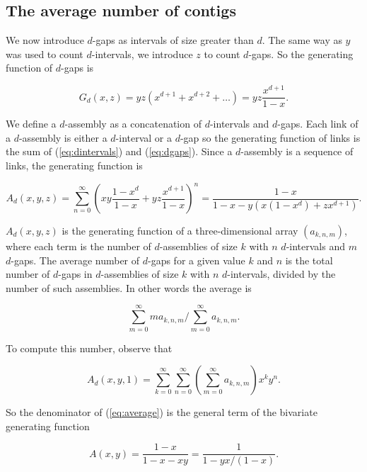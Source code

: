 \documentclass{article}
\begin{document}
\subsection{The average number of contigs}

We now introduce $d$-gaps as intervals of size greater than $d$. The same
way as $y$ was used to count $d$-intervals, we introduce $z$ to count
$d$-gaps. So the generating function of $d$-gaps is

\begin{equation}
\label{eq:dgaps}
G_d(x,z) = yz(x^{d+1}+x^{d+2}+\ldots) = yz\frac{x^{d+1}}{1-x}.
\end{equation}

We define a $d$-assembly as a concatenation of $d$-intervals and $d$-gaps.
Each link of a $d$-assembly is either a $d$-interval or a $d$-gap so the
generating function of links is the sum of (\ref{eq:dintervals}) and
(\ref{eq:dgaps}). Since a $d$-assembly is a sequence of links, the
generating function is

\begin{equation*}
A_d(x,y,z) = \sum_{n=0}^\infty \left(xy\frac{1-x^d}{1-x} +
yz\frac{x^{d+1}}{1-x}\right)^n =
\frac{1-x}{1-x-y\left(x(1-x^d) +zx^{d+1}\right)}.
\end{equation*}

$A_d(x,y,z)$ is the generating function of a three-dimensional array
$(a_{k,n,m})$, where each term is the number of $d$-assemblies of size $k$
with $n$ $d$-intervals and $m$ $d$-gaps. The average number of $d$-gaps
for a given value $k$ and $n$ is the total number of $d$-gaps in
$d$-assemblies of size $k$ with $n$ $d$-intervals, divided by the number
of such assemblies. In other words the average is

\begin{equation}
\label{eq:average}
\sum_{m=0}^\infty ma_{k,n,m}\Big/\sum_{m=0}^\infty a_{k,n,m}.
\end{equation}

To compute this number, observe that

\begin{equation*}
A_d(x,y,1) = \sum_{k=0}^\infty\sum_{n=0}^\infty
\left(\sum_{m=0}^\infty a_{k,n,m}\right) x^ky^n.
\end{equation*}

So the denominator of (\ref{eq:average}) is the general term of the
bivariate generating function

\begin{equation*}
A(x,y) = \frac{1-x}{1-x-xy} = \frac{1}{1-yx/(1-x)}.
\end{equation*}
\end{document}
